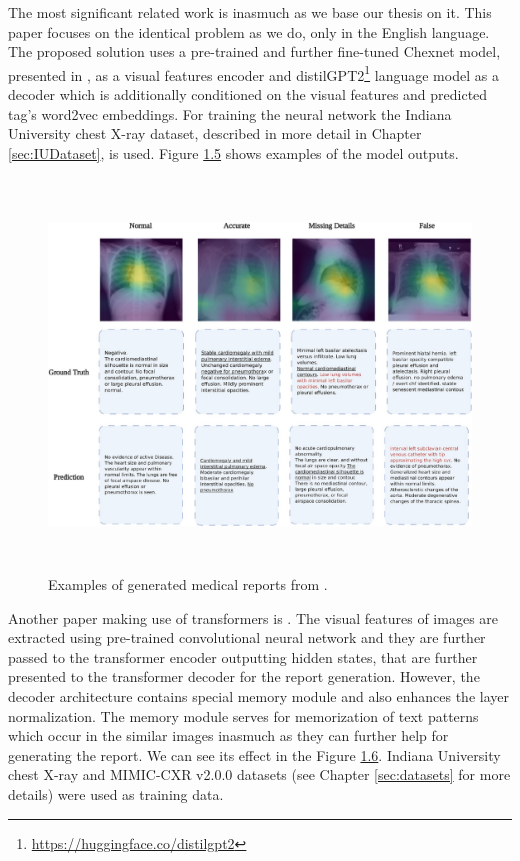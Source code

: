 The most significant related work is \citet{alfarghaly2021automated} inasmuch as we base our thesis on it. This paper focuses on the identical problem as we do, only in the English language. The proposed solution uses a pre-trained and further fine-tuned Chexnet model, presented in \citet{rajpurkar2017chexnet}, as a visual features encoder and distilGPT2\footnote[14]{\url{https://huggingface.co/distilgpt2}} language model\citep{sanh2019distilbert} as a decoder which is additionally conditioned on the visual features and predicted tag's word2vec\citep{mikolov2013distributed} embeddings. For training the neural network the Indiana University chest X-ray dataset, described in more detail in Chapter \ref{sec:IUDataset}, is used. Figure \hyperref[fig05:OmarExample]{1.5} shows examples of the model outputs.\\

\begin{figure}[h]\centering
\includegraphics[width=145mm, height=104mm]{../img/OmarExample}
\caption{Examples of generated medical reports from \citet{alfarghaly2021automated}.}
\label{fig05:OmarExample}
\end{figure}

Another paper making use of transformers is \citet{chen2020generating}. The visual features of images are extracted using pre-trained convolutional neural network and they are further passed to the transformer encoder outputting hidden states, that are further presented to the transformer decoder for the report generation. However, the decoder architecture contains special memory module and also enhances the layer normalization. The memory module serves for memorization of text patterns which occur in the similar images inasmuch as they can further help for generating the report. We can see its effect in the Figure \hyperref[fig06:ZhihongExample]{1.6}. Indiana University chest X-ray and MIMIC-CXR v2.0.0 datasets (see Chapter \ref{sec:datasets} for more details) were used as training data.\\

